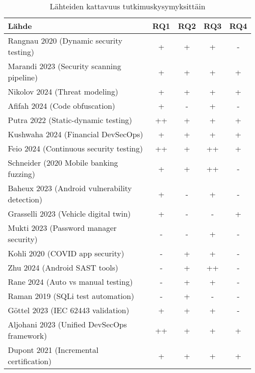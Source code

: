 \documentclass[bscthesis,finnish,oneside,biblatex]{uefcsthesis}
\begin{document}
\begin{table}[htbp]
  \centering
  \footnotesize
  \caption{Lähteiden kattavuus tutkimuskysymyksittäin}
  \label{tab:rq_matrix}
  \begin{tabular}{p{7cm}cccc}
    \toprule
    \textbf{Lähde} & \textbf{RQ1} & \textbf{RQ2} & \textbf{RQ3} & \textbf{RQ4} \\
    \midrule
    Rangnau 2020 (Dynamic security testing)             &  +   &  +  &  +  &  -  \\
    Marandi 2023 (Security scanning pipeline)           &  +   &  +  &  +  &  +  \\
    Nikolov 2024 (Threat modeling)                      &  +   &  +  &  +  &  +  \\
    Afifah 2024 (Code obfuscation)                      &  +   &  -  &  +  &  -  \\
    Putra 2022 (Static-dynamic testing)                 &  ++  &  +  &  +  &  +  \\
    Kushwaha 2024 (Financial DevSecOps)                 &  +   &  +  &  +  &  +  \\
    Feio 2024 (Continuous security testing)             &  ++  &  +  &  ++ &  +  \\
    Schneider (2020 Mobile banking fuzzing)             &  +   &  +  &  ++ &  -  \\
    Baheux 2023 (Android vulnerability detection)       &  +   &  -  &  +  &  -  \\
    Grasselli 2023 (Vehicle digital twin)               &  +   &  -  &  -  &  +  \\
    Mukti 2023 (Password manager security)              &  -   &  -  &  +  &  -  \\
    Kohli 2020 (COVID app security)                     &  -   &  +  &  +  &  -  \\
    Zhu 2024 (Android SAST tools)                       &  -   &  +  &  ++ &  -  \\
    Rane 2024 (Auto vs manual testing)                  &  -   &  +  &  +  &  -  \\
    Raman 2019 (SQLi test automation)                   &  -   &  +  &  -  &  -  \\
    Göttel 2023 (IEC 62443 validation)                  &  +   &  +  &  +  &  -  \\
    Aljohani 2023 (Unified DevSecOps framework)         &  ++  &  +  &  +  &  +  \\
    Dupont 2021 (Incremental certification)             &  +   &  +  &  +  &  +  \\

\end{tabular}
\end{table}
\end{document}
